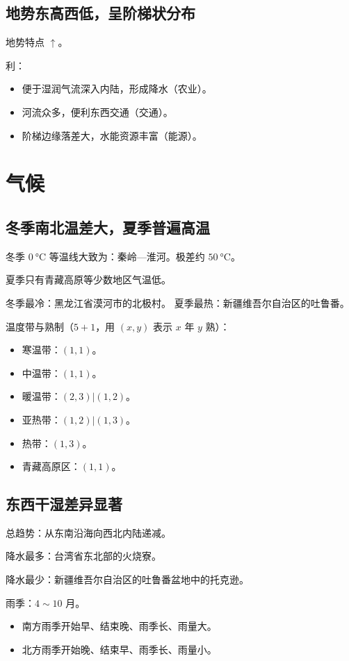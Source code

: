 \documentclass[b5paper,10pt]{book}
\begin{document}
\subsection{地势东高西低，呈阶梯状分布}
地势特点 $\uparrow$。

利：
\begin{itemize}
	\item 便于湿润气流深入内陆，形成降水（农业）。
	\item 河流众多，便利东西交通（交通）。
	\item 阶梯边缘落差大，水能资源丰富（能源）。
\end{itemize}

\section{气候}
\subsection{冬季南北温差大，夏季普遍高温}

冬季 $\qty{0}{\degreeCelsius}$ 等温线大致为：秦岭—淮河。极差约 $\qty{50}{\degreeCelsius}$。

夏季只有青藏高原等少数地区气温低。

冬季最冷：黑龙江省漠河市的北极村。
夏季最热：新疆维吾尔自治区的吐鲁番。

温度带与熟制（$5+1$，用 $(x,y)$ 表示 $x$ 年 $y$ 熟）：
\begin{itemize}
	\item 寒温带：$(1,1)$。
	\item 中温带：$(1,1)$。
	\item 暖温带：$(2,3)|(1,2)$。
	\item 亚热带：$(1,2)|(1,3)$。
	\item 热带：$(1,3)$。
	\item 青藏高原区：$(1,1)$。
\end{itemize}

\subsection{东西干湿差异显著}

总趋势：从东南沿海向西北内陆递减。

降水最多：台湾省东北部的火烧寮。

降水最少：新疆维吾尔自治区的吐鲁番盆地中的托克逊。

雨季：$4\sim10$ 月。

\begin{itemize}
	\item 南方雨季开始早、结束晚、雨季长、雨量大。
	\item 北方雨季开始晚、结束早、雨季长、雨量小。
\end{itemize}
\end{document}
